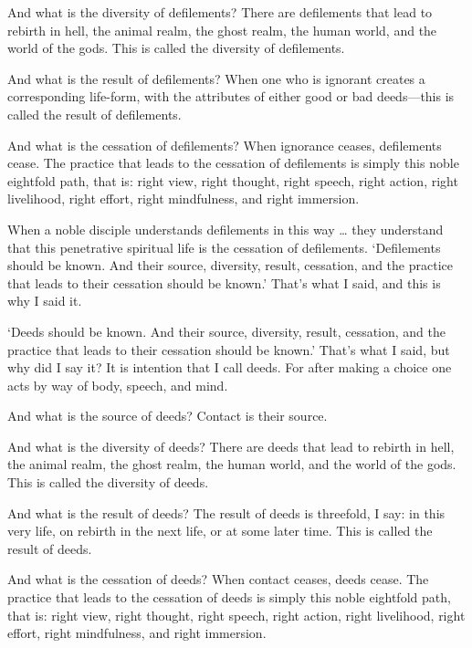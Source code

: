 \documentclass[12pt,openany]{book}%
\begin{document}
And what is the diversity of defilements? There are defilements that lead to rebirth in hell, the animal realm, the ghost realm, the human world, and the world of the gods. This is called the diversity of defilements. 

And what is the result of defilements? When one who is ignorant creates a corresponding life-form, with the attributes of either good or bad deeds—this is called the result of defilements. 

And what is the cessation of defilements? When ignorance ceases, defilements cease. The practice that leads to the cessation of defilements is simply this noble eightfold path, that is: right view, right thought, right speech, right action, right livelihood, right effort, right mindfulness, and right immersion. 

When a noble disciple understands defilements in this way … they understand that this penetrative spiritual life is the cessation of defilements. ‘Defilements should be known. And their source, diversity, result, cessation, and the practice that leads to their cessation should be known.’ That’s what I said, and this is why I said it. 

‘Deeds should be known. And their source, diversity, result, cessation, and the practice that leads to their cessation should be known.’ That’s what I said, but why did I say it? It is intention that I call deeds. For after making a choice one acts by way of body, speech, and mind. 

And what is the source of deeds? Contact is their source. 

And what is the diversity of deeds? There are deeds that lead to rebirth in hell, the animal realm, the ghost realm, the human world, and the world of the gods. This is called the diversity of deeds. 

And what is the result of deeds? The result of deeds is threefold, I say: in this very life, on rebirth in the next life, or at some later time. This is called the result of deeds. 

And what is the cessation of deeds? When contact ceases, deeds cease. The practice that leads to the cessation of deeds is simply this noble eightfold path, that is: right view, right thought, right speech, right action, right livelihood, right effort, right mindfulness, and right immersion. 
\end{document}
